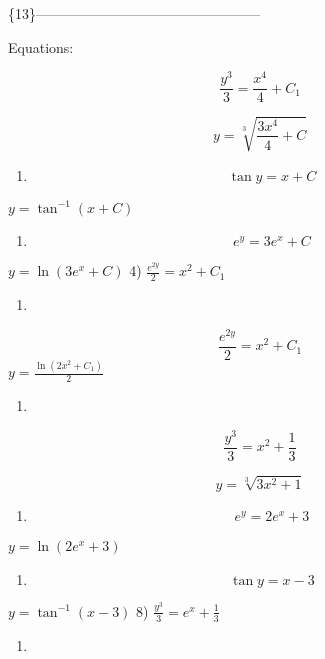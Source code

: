 \documentclass[
]{article}
\providecommand{\tightlist}{%
  \setlength{\itemsep}{0pt}\setlength{\parskip}{0pt}}
\begin{document}
\{13\}------------------------------------------------

Equations:

\[\frac{y^3}{3} = \frac{x^4}{4} + C_1\]

\[y = \sqrt[3]{\frac{3x^4}{4} + C}\]

\begin{enumerate}
\def\labelenumi{\arabic{enumi})}
\setcounter{enumi}{1}
\tightlist
\item
  \[\tan y = x + C\]
\end{enumerate}

\(y = \tan^{-1} (x + C)\)

\begin{enumerate}
\def\labelenumi{\arabic{enumi})}
\setcounter{enumi}{2}
\tightlist
\item
  \[e^y = 3e^x + C\]
\end{enumerate}

\(y = \ln (3e^x + C)\) 4) \(\frac{e^{2y}}{2} = x^2 + C_1\)

\begin{enumerate}
\def\labelenumi{\arabic{enumi})}
\setcounter{enumi}{3}
\tightlist
\item
\end{enumerate}

\[\frac{e^{2y}}{2} = x^2 + C_{1}\] \(y = \frac{\ln(2x^2 + C_{1})}{2}\)

\begin{enumerate}
\def\labelenumi{\arabic{enumi})}
\setcounter{enumi}{4}
\tightlist
\item
\end{enumerate}

\[\frac{y^3}{3} = x^2 + \frac{1}{3}\]

\[y = \sqrt[3]{3x^2 + 1}\]

\begin{enumerate}
\def\labelenumi{\arabic{enumi})}
\setcounter{enumi}{5}
\tightlist
\item
  \[e^y = 2e^x + 3\]
\end{enumerate}

\(y = \ln (2e^x + 3)\)

\begin{enumerate}
\def\labelenumi{\arabic{enumi})}
\setcounter{enumi}{6}
\tightlist
\item
  \[\tan y = x - 3\]
\end{enumerate}

\(y = \tan^{-1}(x - 3)\) 8) \(\frac{y^3}{3} = e^x + \frac{1}{3}\)

\begin{enumerate}
\def\labelenumi{\arabic{enumi})}
\setcounter{enumi}{7}
\tightlist
\item
\end{enumerate}
\end{document}
